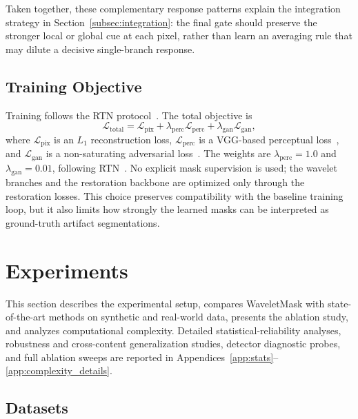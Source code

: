 \documentclass[applsci,article,submit,pdftex,moreauthors]{Definitions/mdpi}
\begin{document}
Taken together, these complementary response patterns explain the integration strategy in Section~\ref{subsec:integration}: the final gate should preserve the stronger local or global cue at each pixel, rather than learn an averaging rule that may dilute a decisive single-branch response.

\subsection{Training Objective}\label{subsec:training}

Training follows the RTN protocol~\cite{rtn2022}. The total objective is
\begin{equation}\label{eq:loss_total}
    \mathcal{L}_{\mathrm{total}}=\mathcal{L}_{\mathrm{pix}}+\lambda_{\mathrm{perc}}\mathcal{L}_{\mathrm{perc}}+\lambda_{\mathrm{gan}}\mathcal{L}_{\mathrm{gan}},
\end{equation}
where $\mathcal{L}_{\mathrm{pix}}$ is an $L_1$ reconstruction loss, $\mathcal{L}_{\mathrm{perc}}$ is a VGG-based perceptual loss~\cite{johnson2016perceptual,simonyan2014vgg}, and $\mathcal{L}_{\mathrm{gan}}$ is a non-saturating adversarial loss~\cite{goodfellow2014gan}. The weights are $\lambda_{\mathrm{perc}}=1.0$ and $\lambda_{\mathrm{gan}}=0.01$, following RTN~\cite{rtn2022}. No explicit mask supervision is used; the wavelet branches and the restoration backbone are optimized only through the restoration losses. This choice preserves compatibility with the baseline training loop, but it also limits how strongly the learned masks can be interpreted as ground-truth artifact segmentations.

\section{Experiments}\label{sec:results}

This section describes the experimental setup, compares WaveletMask with state-of-the-art methods on synthetic and real-world data, presents the ablation study, and analyzes computational complexity. Detailed statistical-reliability analyses, robustness and cross-content generalization studies, detector diagnostic probes, and full ablation sweeps are reported in Appendices~\ref{app:stats}--\ref{app:complexity_details}.

\subsection{Datasets}
\end{document}
